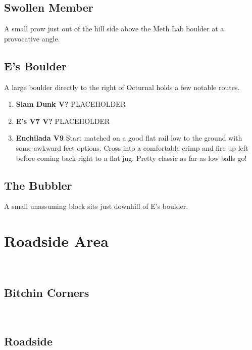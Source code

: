 \subsection*{Swollen Member}\label{bf:Swollen Member}
A small prow just out of the hill side above the Meth Lab boulder at a provocative angle.

\subsection*{E's Boulder}\label{bf:E's Boulder}
A large boulder directly to the right of Octurnal holds a few notable routes.

\begin{enumerate}[resume]
	\item\label{rt:Slam Dunk} \colorbox{black!20}{\textbf{Slam Dunk V?  } }
	\newline PLACEHOLDER\
	\item\label{rt:E's V7} \colorbox{black!20}{\textbf{E's V7 V?  } }
	\newline PLACEHOLDER\
	\item\label{rt:Enchilada} \colorbox{Goldenrod!50}{\textbf{Enchilada V9     } }
	\newline Start matched on a good flat rail low to the ground with some awkward feet options. Cross into a comfortable crimp and fire up left before coming back right to a flat jug. Pretty classic as far as low balls go!\
\end{enumerate}
\subsection*{The Bubbler}\label{bf:The Bubbler}
A small unassuming block sits just downhill of E's boulder.

\section{Roadside Area}\label{sa:Roadside Area}
\

\subsection*{Bitchin Corners}\label{bf:Bitchin Corners}
\

\subsection*{Roadside}\label{bf:Roadside}
\

